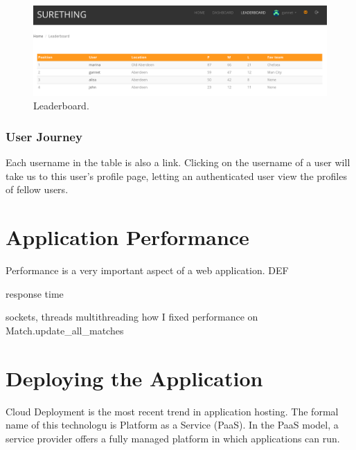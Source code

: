 \begin{figure}[H]
	\begin{center}
		\includegraphics[width=.90\textwidth]{impl/images/leaderboard}
		\caption{Leaderboard.} \label{fig:using: leaderboard}
	\end{center}
\end{figure}

\subsubsection*{User Journey}
\label{subsec:leaderboarduserjourney}
Each username in the table is also a link. Clicking on the username of a user will take us to this user's profile page, letting an authenticated user view the profiles of fellow users.

\section{Application Performance}
\label{sec:applicationperformance}
Performance is a very important aspect of a web application. DEF

response time

sockets, threads
multithreading
how I fixed performance on Match.update\_all\_matches

\section{Deploying the Application}
Cloud Deployment is the most recent trend in application hosting. The formal name of this technologu is Platform as a Service (PaaS).  In the PaaS model, a service provider offers a fully managed platform in which applications can run.